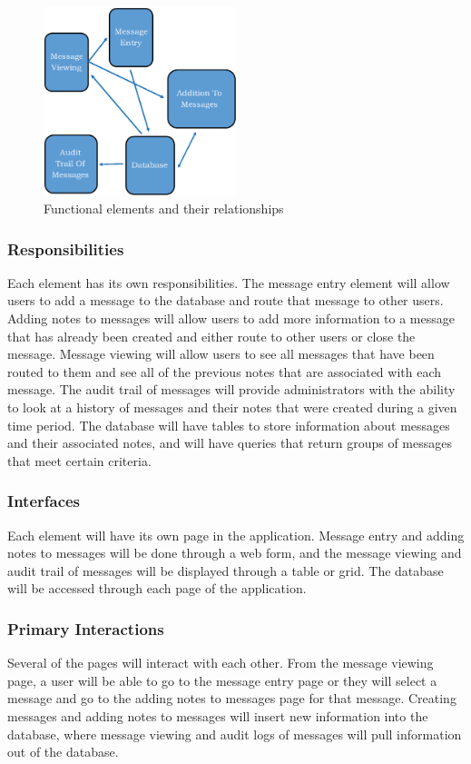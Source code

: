 \documentclass[onecolumn, draftclsnofoot,10pt, compsoc]{IEEEtran}
\begin{document}
\begin{figure}[h!]
  \includegraphics[width=0.5\textwidth]{functional_elements}
  \caption{Functional elements and their relationships}
\end{figure}

\subsubsection{Responsibilities}
Each element has its own responsibilities. The message entry element will allow users to add a message to the database and route that message to other users. Adding notes to messages will allow users to add more information to a message that has already been created and either route to other users or close the message. Message viewing will allow users to see all messages that have been routed to them and see all of the previous notes that are associated with each message. The audit trail of messages will provide administrators with the ability to look at a history of messages and their notes that were created during a given time period. The database will have tables to store information about messages and their associated notes, and will have queries that return groups of messages that meet certain criteria.
\subsubsection{Interfaces}
Each element will have its own page in the application. Message entry and adding notes to messages will be done through a web form, and the message viewing and audit trail of messages will be displayed through a table or grid. The database will be accessed through each page of the application. 

\subsubsection{Primary Interactions}
Several of the pages will interact with each other. From the message viewing page, a user will be able to go to the message entry page or they will select a message and go to the adding notes to messages page for that message. Creating messages and adding notes to messages will insert new information into the database, where message viewing and audit logs of messages will pull information out of the database.
\end{document}
